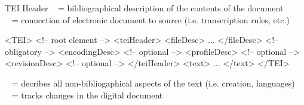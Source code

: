\begin{frame}[fragile]{TEI Header}
\footnotesize
{}~ = bibliographical description of the contents of the document  \\
~ = connection of electronic document to source (i.e. transcription rules, etc.)  \\

\begin{xmlcode}
<TEI> <!-- root element -->
    <teiHeader>
        <fileDesc> ... </fileDesc> <!-- obligatory --> 
        <encodingDesc> <!-- optional -->
        <profileDesc> <!-- optional -->
        <revisionDesc> <!-- optional -->
    </teiHeader> 
    <text> ... </text>
</TEI>
\end{xmlcode}

~ = decribes all non-bibliogaphical aspects of the text (i.e. creation, languages) \\
~ = tracks changes in the digital document 
\end{frame}

